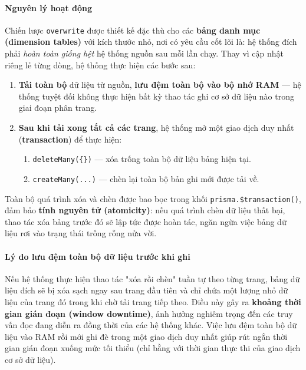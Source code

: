 \paragraph{Nguyên lý hoạt động}

Chiến lược \texttt{overwrite} được thiết kế đặc thù cho các \textbf{bảng danh mục (dimension tables)} với kích thước nhỏ, nơi có yêu cầu cốt lõi là: hệ thống đích phải \textit{hoàn toàn giống hệt} hệ thống nguồn sau mỗi lần chạy. Thay vì cập nhật riêng lẻ từng dòng, hệ thống thực hiện các bước sau:

\begin{enumerate}
  \item \textbf{Tải toàn bộ} dữ liệu từ nguồn, \textbf{lưu đệm toàn bộ vào bộ nhớ RAM} — hệ thống tuyệt đối không thực hiện bất kỳ thao tác ghi cơ sở dữ liệu nào trong giai đoạn phân trang.
  \item \textbf{Sau khi tải xong tất cả các trang}, hệ thống mở một giao dịch duy nhất (\textbf{transaction}) để thực hiện:
        \begin{enumerate}
          \item \texttt{deleteMany(\{\})} — xóa trống toàn bộ dữ liệu bảng hiện tại.
          \item \texttt{createMany(...)} — chèn lại toàn bộ bản ghi mới được tải về.
        \end{enumerate}
\end{enumerate}

Toàn bộ quá trình xóa và chèn được bao bọc trong khối \texttt{prisma.\$transaction()}, đảm bảo \textbf{tính nguyên tử (atomicity)}: nếu quá trình chèn dữ liệu thất bại, thao tác xóa bảng trước đó sẽ lập tức được hoàn tác, ngăn ngừa việc bảng dữ liệu rơi vào trạng thái trống rỗng nửa vời.

\paragraph{Lý do lưu đệm toàn bộ dữ liệu trước khi ghi}

Nếu hệ thống thực hiện thao tác "xóa rồi chèn" tuần tự theo từng trang, bảng dữ liệu đích sẽ bị xóa sạch ngay sau trang đầu tiên và chỉ chứa một lượng nhỏ dữ liệu của trang đó trong khi chờ tải trang tiếp theo. Điều này gây ra \textbf{khoảng thời gian gián đoạn (window downtime)}, ảnh hưởng nghiêm trọng đến các truy vấn đọc đang diễn ra đồng thời của các hệ thống khác. Việc lưu đệm toàn bộ dữ liệu vào RAM rồi mới ghi đè trong một giao dịch duy nhất giúp rút ngắn thời gian gián đoạn xuống mức tối thiểu (chỉ bằng với thời gian thực thi của giao dịch cơ sở dữ liệu).

